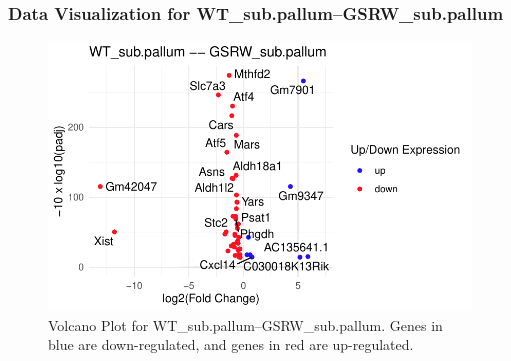 \documentclass[
  letterpaper,
  DIV=11,
  numbers=noendperiod]{scrartcl}
\newenvironment{Shaded}{\begin{snugshade}}{\end{snugshade}}
\newcommand{\NormalTok}[1]{\textcolor[rgb]{0.00,0.23,0.31}{#1}}
\newcommand{\SpecialCharTok}[1]{\textcolor[rgb]{0.37,0.37,0.37}{#1}}
\begin{document}
\hypertarget{data-visualization-for-wt_sub.pallumgsrw_sub.pallum}{%
\subsubsection{Data Visualization for
WT\_sub.pallum--GSRW\_sub.pallum}\label{data-visualization-for-wt_sub.pallumgsrw_sub.pallum}}

\begin{Shaded}
\end{Shaded}

\begin{figure}[H]

{\centering \includegraphics{sample_report_trial_files/figure-pdf/fig-volcano_2-1.pdf}

}

\caption{\label{fig-volcano_2}Volcano Plot for
WT\_sub.pallum--GSRW\_sub.pallum. Genes in blue are down-regulated, and
genes in red are up-regulated.}

\end{figure}

\begin{Shaded}
\end{Shaded}
\end{document}
